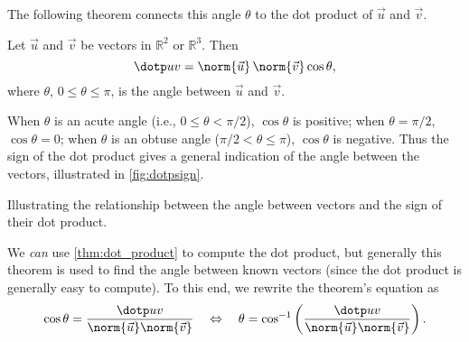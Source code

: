 The following theorem connects this angle $\theta$ to the dot product of $\vec u$ and $\vec v$.

{Let $\vec u$ and $\vec v$ be vectors in $\mathbb{R}^2$ or $\mathbb{R}^3$. Then 
\[\dotp uv = \norm{\vec u}\,\norm{\vec v} \cos\theta,\]
where $\theta$, $0\leq\theta\leq \pi$, is the angle between $\vec u$ and $\vec v$.
}

When $\theta$ is an acute angle (i.e., $0\leq \theta <\pi/2$), $\cos \theta$ is positive; when $\theta = \pi/2$, $\cos \theta = 0$; when $\theta$ is an obtuse angle ($\pi/2<\theta \leq \pi$), $\cos \theta$ is negative. Thus the sign of the dot product gives a general indication of the angle between the vectors, illustrated in \autoref{fig:dotpsign}.

\begin{lxfigure}
\centering
{}
\caption{Illustrating the relationship between the angle between vectors and the sign of their dot product.}
\label{fig:dotpsign}
\end{lxfigure}

We \emph{can} use \autoref{thm:dot_product} to compute the dot product, but generally this theorem is used to find the angle between known vectors (since the dot product is generally easy to compute). To this end, we rewrite the theorem's equation as
\[\cos \theta = \frac{\dotp uv}{\norm{\vec u}\norm{\vec v}} \quad \Leftrightarrow \quad \theta = \cos^{-1}\left(\frac{\dotp uv}{\norm{\vec u}\norm{\vec v}}\right).\]

